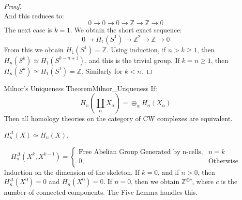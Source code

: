\documentclass[crop=false,class=book,oneside]{standalone}
\begin{document}
\begin{proof}
\begin{equation}
            \end{equation}
            And this reduces to:
            \begin{equation}
                0\longrightarrow0\longrightarrow0\longrightarrow
                \mathbb{Z}\longrightarrow\mathbb{Z}\longrightarrow0
            \end{equation}
            The next case is $k=1$. We obtain the short exact sequence:
            \begin{equation}
                0\longrightarrow{H}_{1}(S^{1})\longrightarrow
                \mathbb{Z}^{2}\longrightarrow\mathbb{Z}\longrightarrow0
            \end{equation}
            From this we obtain $H_{1}(S^{1})=\mathbb{Z}$. Using induction,
            if $n>k\geq{1}$, then $H_{n}(S^{k})\simeq{H}_{1}(S^{k-n+1})$,
            and this is the trivial group. If $k=n\geq{1}$, then
            $H_{n}(S^{k})\simeq{H}_{1}(S^{1})=\mathbb{Z}$. Similarly for
            $k<n$.
        \end{proof}
        \begin{ltheorem}{Milnor's Uniqueness Theorem}{Milnor_Unqueness}
            If:
            \begin{equation}
                H_{n}(\coprod_{\alpha}X_{\alpha})
                =\oplus_{\alpha}H_{n}(X_{\alpha})
            \end{equation}
            Then all homology theories on the category of CW complexes
            are equivalent.
        \end{ltheorem}
        \begin{theorem}
            $H_{n}^{\Delta}(X)\simeq{H}_{n}(X)$.
        \end{theorem}
        \begin{equation}
            H_{n}^{\Delta}(X^{k},X^{k-1})=
            \begin{cases}
                \textrm{Free Abelian Group Generated by n-cells},&n=k\\
                0,&\textrm{Otherwise}
            \end{cases}
        \end{equation}
        Induction on the dimension of the skeleton. If $k=0$, and if
        $n>0$, then $H_{n}^{\Delta}(X^{0})=0$ and $H_{n}(X^{0})=0$. If
        $n=0$, then we obtain $\mathbb{Z}^{\oplus{c}}$, where $c$ is the
        number of connected components. The Five Lemma handles this.
\end{document}
